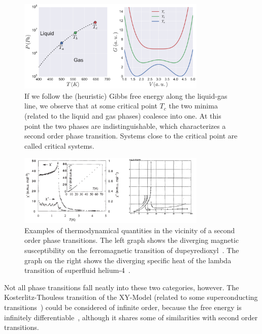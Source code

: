 \begin{figure}
\begin{center}
    \includegraphics[width=0.8\textwidth]{chapters/ch2-crit/figs/gibbs2}
\end{center}
\caption{If we follow the (heuristic) Gibbs free energy along the liquid-gas
    line, we observe that at some critical point $T_c$ the two minima (related
    to the liquid and gas phases) coalesce into one. At this point the two
    phases are indistinguishable, which characterizes a second order phase
    transition. Systems close to the critical point are called critical
    systems.}
\label{fig:gibbs2}
\end{figure}


\begin{figure}
\begin{center}
    \includegraphics[width=0.8\textwidth]{chapters/ch2-crit/figs/suscep}
\end{center}
\caption{Examples of thermodynamical quantities in the vicinity of a second
    order phase transitions. The left graph shows the diverging magnetic
    susceptibility on the ferromagnetic transition of
    dupeyredioxyl~\cite{Chiarelli1993}. The graph on the right shows the
    diverging specific heat of the lambda transition of superfluid
    helium-4~\cite{Keesom1935}.}
\label{fig:suscep}
\end{figure}

Not all phase transitions fall neatly into these two categories, however. The
Kosterlitz-Thouless transition of the XY-Model (related to some superconducting
transitions~\cite{Resnick1981}) could be considered of infinite order, because
the free energy is infinitely differentiable~\cite{Kosterlitz1973}, although it
shares some of similarities with second order transitions.

